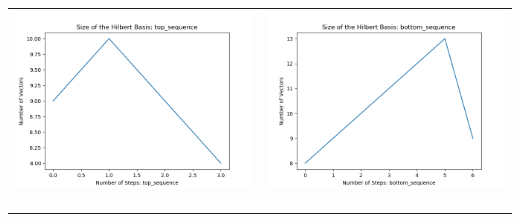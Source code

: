 \documentclass[10pt]{article}
\begin{document}
\begin{tabular}{c|c}
\begin{minipage}{.4\textwidth}
\includegraphics[width=\textwidth]{"DATA/4d/4 generators 2 bound J/top_sequence SIZE"}
\end{minipage} &
\begin{minipage}{.4\textwidth}
\includegraphics[width=\textwidth]{"DATA/4d/4 generators 2 bound J bottomup/bottom_sequence SIZE"}
\end{minipage} \\ \\
\hline \\\begin{minipage}{.4\textwidth}

\end{minipage}
\end{tabular}
\end{document}
